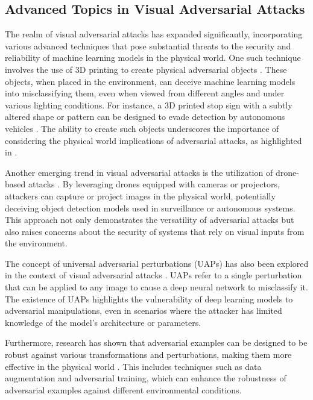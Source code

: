\documentclass[11pt,a4paper]{article}
\begin{document}
\subsection{Advanced Topics in Visual Adversarial Attacks}


The realm of visual adversarial attacks has expanded significantly, incorporating various advanced techniques that pose substantial threats to the security and reliability of machine learning models in the physical world. One such technique involves the use of 3D printing to create physical adversarial objects \cite{arxiv:1707.08945}. These objects, when placed in the environment, can deceive machine learning models into misclassifying them, even when viewed from different angles and under various lighting conditions. For instance, a 3D printed stop sign with a subtly altered shape or pattern can be designed to evade detection by autonomous vehicles \cite{arxiv:1807.07769}. The ability to create such objects underscores the importance of considering the physical world implications of adversarial attacks, as highlighted in \cite{doi:10.24963/ijcai.2021/694}.

Another emerging trend in visual adversarial attacks is the utilization of drone-based attacks \cite{doi:10.1109/iros51168.2021.9636638}. By leveraging drones equipped with cameras or projectors, attackers can capture or project images in the physical world, potentially deceiving object detection models used in surveillance or autonomous systems. This approach not only demonstrates the versatility of adversarial attacks but also raises concerns about the security of systems that rely on visual inputs from the environment. 

The concept of universal adversarial perturbations (UAPs) has also been explored in the context of visual adversarial attacks \cite{arxiv:1904.06347}. UAPs refer to a single perturbation that can be applied to any image to cause a deep neural network to misclassify it. The existence of UAPs highlights the vulnerability of deep learning models to adversarial manipulations, even in scenarios where the attacker has limited knowledge of the model's architecture or parameters.

Furthermore, research has shown that adversarial examples can be designed to be robust against various transformations and perturbations, making them more effective in the physical world \cite{doi:10.1109/cvpr.2019.00284}. This includes techniques such as data augmentation and adversarial training, which can enhance the robustness of adversarial examples against different environmental conditions. 
\end{document}
